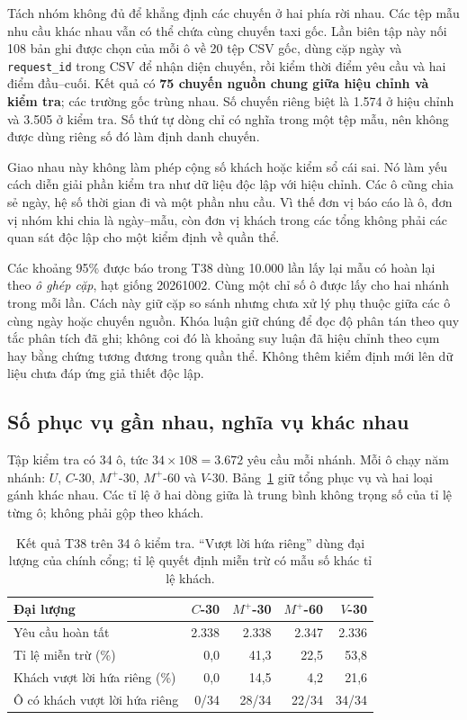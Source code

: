 Tách nhóm không đủ để khẳng định các chuyến ở hai phía rời nhau. Các tệp mẫu
nhu cầu khác nhau vẫn có thể chứa cùng chuyến taxi gốc. Lần biên tập này nối
108 bản ghi được chọn của mỗi ô về 20 tệp CSV gốc, dùng cặp ngày và
\texttt{request\_id} trong CSV để nhận diện chuyến, rồi kiểm thời điểm yêu cầu
và hai điểm đầu--cuối. Kết quả có \textbf{75 chuyến nguồn chung giữa hiệu chỉnh
và kiểm tra}; các trường gốc trùng nhau. Số chuyến riêng biệt là 1.574 ở hiệu
chỉnh và 3.505 ở kiểm tra. Số thứ tự dòng chỉ có nghĩa trong một tệp mẫu,
nên không được dùng riêng số đó làm định danh chuyến.

Giao nhau này không làm phép cộng số khách hoặc kiểm sổ cái sai. Nó làm yếu
cách diễn giải phần kiểm tra như dữ liệu độc lập với hiệu chỉnh. Các ô cũng
chia sẻ ngày, hệ số thời gian đi và một phần nhu cầu. Vì thế đơn vị báo cáo
là ô, đơn vị nhóm khi chia là ngày--mẫu, còn đơn vị khách trong các tổng không
phải các quan sát độc lập cho một kiểm định về quần thể.

Các khoảng 95\% được báo trong T38 dùng 10.000 lần lấy lại mẫu có hoàn lại
theo \emph{ô ghép cặp}, hạt giống 20261002. Cùng một chỉ số ô được lấy cho hai
nhánh trong mỗi lần. Cách này giữ cặp so sánh nhưng chưa xử lý phụ thuộc giữa
các ô cùng ngày hoặc chuyến nguồn. Khóa luận giữ chúng để đọc độ phân tán theo
quy tắc phân tích đã ghi; không coi đó là khoảng suy luận đã hiệu chỉnh theo
cụm hay bằng chứng tương đương trong quần thể. Không thêm kiểm định mới lên
dữ liệu chưa đáp ứng giả thiết độc lập.

\subsection{Số phục vụ gần nhau, nghĩa vụ khác nhau}

Tập kiểm tra có 34 ô, tức $34\times108=3.672$ yêu cầu mỗi nhánh. Mỗi ô chạy năm
nhánh: $U$, $C$-30, $M^{+}$-30, $M^{+}$-60 và $V$-30. Bảng~\ref{bang:t38-phucvu}
giữ tổng phục vụ và hai loại gánh khác nhau. Các tỉ lệ ở hai dòng giữa là
trung bình không trọng số của tỉ lệ từng ô; không phải gộp theo khách.

\begin{table}[htbp]
\centering
\caption{Kết quả T38 trên 34 ô kiểm tra. ``Vượt lời hứa riêng'' dùng đại lượng
của chính cổng; tỉ lệ quyết định miễn trừ có mẫu số khác tỉ lệ khách.}
\label{bang:t38-phucvu}
\small
\begin{tabularx}{\linewidth}{@{}Xrrrr@{}}
\toprule
\textbf{Đại lượng} & \textbf{$C$-30} & \textbf{$M^{+}$-30} & \textbf{$M^{+}$-60} & \textbf{$V$-30}\\
\midrule
Yêu cầu hoàn tất & 2.338 & 2.338 & 2.347 & 2.336\\
Tỉ lệ miễn trừ (\%) & 0,0 & 41,3 & 22,5 & 53,8\\
Khách vượt lời hứa riêng (\%) & 0,0 & 14,5 & 4,2 & 21,6\\
Ô có khách vượt lời hứa riêng & 0/34 & 28/34 & 22/34 & 34/34\\
\bottomrule
\end{tabularx}
\end{table}

